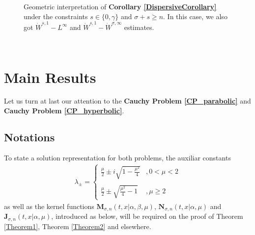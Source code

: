 \documentclass{amsart}
\theoremstyle{definition}
\theoremstyle{remark}
\numberwithin{equation}{section}
\begin{document}
\begin{figure}
	\caption{Geometric interpretation of {\bf Corollary \ref{DispersiveCorollary}} under the constraints $s\in \{0,\gamma\}$ and $\sigma+s\geq n$. In this case, we also got $\dot{W}^{s,1}-L^\infty$ and $\dot{W}^{s,1}-\dot{W}^{\sigma,\infty}$ estimates.}
\end{figure}


\newpage 
~
\newpage
~
\newpage 

\section{Main Results}\label{MainSection}


Let us turn at last our attention to the {\bf Cauchy Problem \ref{CP_parabolic}} and {\bf Cauchy Problem \ref{CP_hyperbolic}}. 

\subsection{Notations}

To state a solution representation for both problems, the auxiliar constants
\begin{eqnarray}
	\label{RootsLambda}\lambda_{\pm} =\begin{cases}
		\displaystyle \frac{\mu}{2}\pm i\sqrt{1-\frac{\mu^2}{4}}&, 0< \mu<2 \\ \ \\
		\displaystyle \frac{\mu}{2}\pm \sqrt{\frac{\mu^2}{4}-1} &, \mu\geq 2 
	\end{cases}
\end{eqnarray}
as well as the kernel functions ${\bm M}_{\sigma,n}(t,x|\alpha,\beta,\mu)$, ${\bm N}_{\sigma,n}(t,x|\alpha,\mu)$ and ${\bm J}_{\sigma,n}(t,x|\alpha,\mu)$, introduced as below, will be required on the proof of Theorem \ref{Theorem1}, Theorem \ref{Theorem2} and elsewhere.
\end{document}
